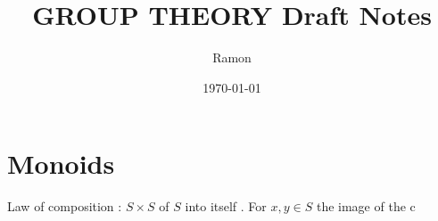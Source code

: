 \documentclass{article}
\begin{document}
	
	\title{GROUP THEORY Draft Notes}
	\author{Ramon}
	\date{\today}
	
	\maketitle
	\section{Monoids}
	
	Law of composition : $S \times S$ of $S$ into itself . For $x,y \in S$ the image of the c
	
\end{document}
